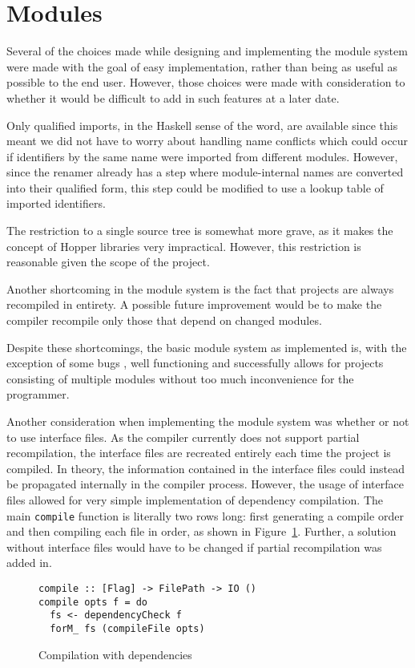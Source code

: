 \section{Modules}

Several of the choices made while designing and implementing the module system were made with the goal of easy implementation, rather than being as useful as possible to the end user. However, those choices were made with consideration to whether it would be difficult to add in such features at a later date.


Only qualified imports, in the Haskell sense of the word, are available since this meant we did not have to worry about handling name conflicts which could occur if identifiers by the same name  were imported from different modules. However, since  the renamer already has a step where module-internal names are converted into their qualified form, this step could be modified to use a lookup table of imported identifiers.

The restriction to a single source tree is somewhat more grave, as it makes the concept of Hopper libraries very impractical. However, this restriction is reasonable given the scope of the project.

Another shortcoming in the module system is the fact that projects are always recompiled in entirety. A possible future improvement would be to make the compiler recompile only those that depend on changed modules.

Despite these shortcomings, the basic module system as implemented is, with the exception of some bugs , well functioning and successfully allows for projects consisting of multiple modules without too much inconvenience for the programmer.

Another consideration when implementing the module system was whether or not to use interface files. As the compiler currently does not support partial recompilation, the interface files are recreated entirely each time the project is compiled. In theory, the information contained in the interface files could instead be propagated internally in the compiler process. However, the usage of interface files allowed for very simple implementation of dependency compilation. The main \texttt{compile} function is literally two rows long: first generating a compile order and then compiling each file in order, as shown in Figure~\ref{lst:compile}. Further, a solution without interface files would have to be changed if partial recompilation was added in.

\begin{figure}[!ht]
\centering
\begin{lstlisting} 
compile :: [Flag] -> FilePath -> IO ()
compile opts f = do
  fs <- dependencyCheck f
  forM_ fs (compileFile opts)
\end{lstlisting}
\caption{Compilation with dependencies}
\label{lst:compile}
\end{figure}